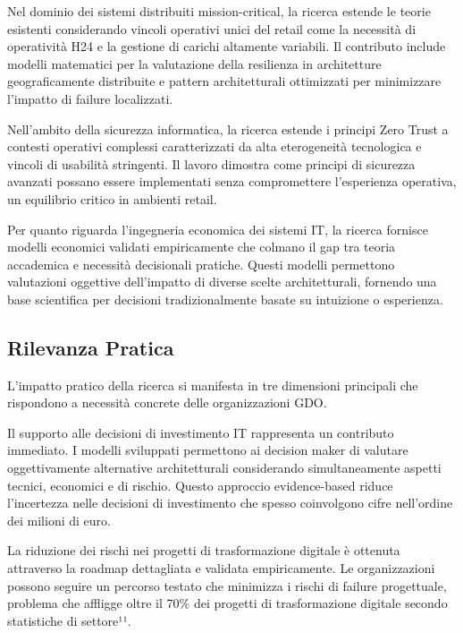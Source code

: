 \documentclass[12pt,a4paper,oneside]{book}
\numberwithin{figure}{chapter} %
\numberwithin{table}{chapter}  %
\begin{document}
Nel dominio dei sistemi distribuiti mission-critical, la ricerca estende
le teorie esistenti considerando vincoli operativi unici del retail come
la necessità di operatività H24 e la gestione di carichi altamente
variabili. Il contributo include modelli matematici per la valutazione
della resilienza in architetture geograficamente distribuite e pattern
architetturali ottimizzati per minimizzare l'impatto di failure
localizzati.

Nell'ambito della sicurezza informatica, la ricerca estende i principi
Zero Trust a contesti operativi complessi caratterizzati da alta
eterogeneità tecnologica e vincoli di usabilità stringenti. Il lavoro
dimostra come principi di sicurezza avanzati possano essere implementati
senza compromettere l'esperienza operativa, un equilibrio critico in
ambienti retail.

Per quanto riguarda l'ingegneria economica dei sistemi IT, la ricerca
fornisce modelli economici validati empiricamente che colmano il gap tra
teoria accademica e necessità decisionali pratiche. Questi modelli
permettono valutazioni oggettive dell'impatto di diverse scelte
architetturali, fornendo una base scientifica per decisioni
tradizionalmente basate su intuizione o esperienza.

\subsection{\texorpdfstring{\textbf{Rilevanza
Pratica}}{1.8.2 Rilevanza Pratica}}\label{rilevanza-pratica}

L'impatto pratico della ricerca si manifesta in tre dimensioni
principali che rispondono a necessità concrete delle organizzazioni GDO.

Il supporto alle decisioni di investimento IT rappresenta un contributo
immediato. I modelli sviluppati permettono ai decision maker di valutare
oggettivamente alternative architetturali considerando simultaneamente
aspetti tecnici, economici e di rischio. Questo approccio evidence-based
riduce l'incertezza nelle decisioni di investimento che spesso
coinvolgono cifre nell'ordine dei milioni di euro.

La riduzione dei rischi nei progetti di trasformazione digitale è
ottenuta attraverso la roadmap dettagliata e validata empiricamente. Le
organizzazioni possono seguire un percorso testato che minimizza i
rischi di failure progettuale, problema che affligge oltre il 70\% dei
progetti di trasformazione digitale secondo statistiche di settore¹¹.
\end{document}
